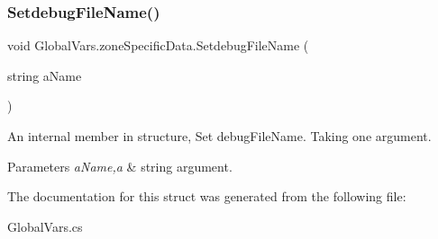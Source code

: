 \subsubsection{\texorpdfstring{SetdebugFileName()}{SetdebugFileName()}}
{\footnotesize\ttfamily void Global\+Vars.\+zone\+Specific\+Data.\+Setdebug\+File\+Name (\begin{DoxyParamCaption}\item[{string}]{a\+Name }\end{DoxyParamCaption})\hspace{0.3cm}{\ttfamily [inline]}}



An internal member in structure, Set debug\+File\+Name. Taking one argument. 


\begin{DoxyParams}{Parameters}
{\em a\+Name,a} & string argument. \\
\hline
\end{DoxyParams}


The documentation for this struct was generated from the following file\+:\begin{DoxyCompactItemize}
\item 
Global\+Vars.\+cs\end{DoxyCompactItemize}
